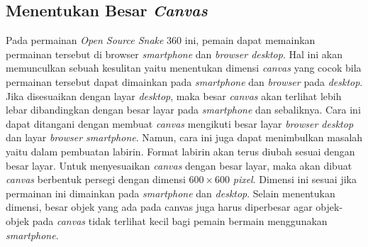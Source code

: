 \subsection{Menentukan Besar \textit{Canvas}}
Pada permainan \textit{Open Source Snake} 360 ini, pemain dapat memainkan permainan tersebut di browser \textit{smartphone} dan \textit{browser desktop}. Hal ini akan memunculkan sebuah kesulitan yaitu menentukan dimensi \textit{canvas} yang cocok bila permainan tersebut dapat dimainkan pada \textit{smartphone} dan \textit{browser} pada \textit{desktop}. Jika disesuaikan dengan layar \textit{desktop}, maka besar \textit{canvas} akan terlihat lebih lebar dibandingkan dengan besar layar pada \textit{smartphone} dan sebaliknya. Cara ini dapat ditangani dengan membuat \textit{canvas} mengikuti besar layar \textit{browser desktop} dan layar \textit{browser smartphone}. Namun, cara ini juga dapat menimbulkan masalah yaitu dalam pembuatan labirin. Format labirin akan terus diubah sesuai dengan besar layar. Untuk menyesuaikan \textit{canvas} dengan besar layar, maka akan dibuat \textit{canvas} berbentuk persegi dengan dimensi $600 \times 600$ \textit{pixel}. Dimensi ini sesuai jika permainan ini dimainkan pada \textit{smartphone} dan \textit{desktop}. Selain menentukan dimensi, besar objek yang ada pada canvas juga harus diperbesar agar objek-objek pada \textit{canvas} tidak terlihat kecil bagi pemain bermain menggunakan \textit{smartphone}. 

